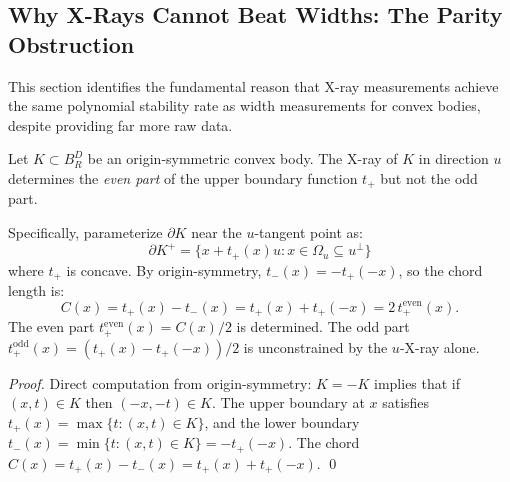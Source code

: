 % 
%


\subsection{Why X-Rays Cannot Beat Widths: The Parity Obstruction}

This section identifies the fundamental reason that X-ray measurements achieve the same polynomial stability rate as width measurements for convex bodies, despite providing far more raw data.

\begin{lemma}
\label{lem:even}
Let $K \subset B_R^D$ be an origin-symmetric convex body. The X-ray of $K$ in direction $u$ determines the \emph{even part} of the upper boundary function $t_+$ but not the odd part.

Specifically, parameterize $\partial K$ near the $u$-tangent point as:
\[
  \partial K^+ = \{x + t_+(x) u : x \in \Omega_u \subseteq u^\perp\}
\]
where $t_+$ is concave. By origin-symmetry, $t_-(x) = -t_+(-x)$, so the chord length is:
\[
  C(x) = t_+(x) - t_-(x) = t_+(x) + t_+(-x) = 2\, t_+^{\mathrm{even}}(x).
\]
The even part $t_+^{\mathrm{even}}(x) = C(x)/2$ is determined. The odd part $t_+^{\mathrm{odd}}(x) = (t_+(x) - t_+(-x))/2$ is unconstrained by the $u$-X-ray alone.
\end{lemma}

\begin{proof}
Direct computation from origin-symmetry: $K = -K$ implies that if $(x, t) \in K$ then $(-x, -t) \in K$. The upper boundary at $x$ satisfies $t_+(x) = \max\{t : (x, t) \in K\}$, and the lower boundary $t_-(x) = \min\{t : (x,t) \in K\} = -t_+(-x)$. The chord $C(x) = t_+(x) - t_-(x) = t_+(x) + t_+(-x)$. \qed
\end{proof}

